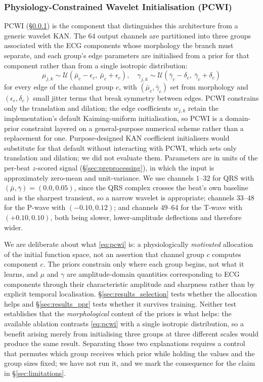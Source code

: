 \documentclass[journal,twoside,web]{ieeecolor}
\begin{document}
\subsubsection{Physiology-Constrained Wavelet Initialisation (PCWI)}
\label{sec:pcwi}
PCWI (\S\ref{sec:pcwi}) is the component that distinguishes this architecture from a generic wavelet KAN. The 64 output channels are partitioned into three groups associated with the ECG components whose morphology the branch must separate, and each group's edge parameters are initialised from a prior for that component rather than from a single isotropic distribution:
\begin{equation}
\mu_{j,k} \sim \mathcal{U}(\bar\mu_c - \epsilon_c,\ \bar\mu_c + \epsilon_c),\quad
\gamma_{j,k} \sim \mathcal{U}(\bar\gamma_c - \delta_c,\ \bar\gamma_c + \delta_c)
\label{eq:pcwi}
\end{equation}
for every edge of the channel group $c$, with $(\bar\mu_c,\bar\gamma_c)$ set from morphology and $(\epsilon_c,\delta_c)$ small jitter terms that break symmetry between edges. PCWI constrains only the translation and dilation; the edge coefficients $w_{j,k}$ retain the implementation's default Kaiming-uniform initialisation, so PCWI is a domain-prior constraint layered on a general-purpose numerical scheme rather than a replacement for one. Purpose-designed KAN coefficient initialisers \cite{rigas_initialization_2025} would substitute for that default without interacting with PCWI, which sets only translation and dilation; we did not evaluate them. Parameters are in units of the per-beat $z$-scored signal (\S\ref{sec:preprocessing}), in which the input is approximately zero-mean and unit-variance. We use channels $1$--$32$ for QRS with $(\bar\mu,\bar\gamma)=(0.0,0.05)$, since the QRS complex crosses the beat's own baseline and is the sharpest transient, so a narrow wavelet is appropriate; channels $33$--$48$ for the P-wave with $(-0.10,0.12)$; and channels $49$--$64$ for the T-wave with $(+0.10,0.10)$, both being slower, lower-amplitude deflections and therefore wider.

We are deliberate about what \eqref{eq:pcwi} is: a physiologically \emph{motivated} allocation of the initial function space, not an assertion that channel group $c$ computes component $c$. The priors constrain only where each group begins, not what it learns, and $\mu$ and $\gamma$ are amplitude-domain quantities corresponding to ECG components through their characteristic amplitude and sharpness rather than by explicit temporal localisation. \S\ref{sec:results_selection} tests whether the allocation helps and \S\ref{sec:results_ppr} tests whether it survives training. Neither test establishes that the \emph{morphological} content of the priors is what helps: the available ablation contrasts \eqref{eq:pcwi} with a single isotropic distribution, so a benefit arising merely from initialising three groups at three different scales would produce the same result. Separating those two explanations requires a control that permutes which group receives which prior while holding the values and the group sizes fixed; we have not run it, and we mark the consequence for the claim in \S\ref{sec:limitations}.
\end{document}
